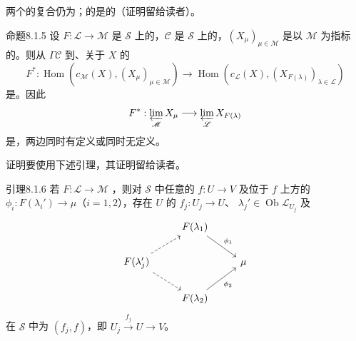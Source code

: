两个的复合仍为；的是的（证明留给读者）。
\begin{SGAresult}{命题}{8.1.5}
设 $F:\mathscr L\to\mathscr M$ 是 $\mathscr S$ 上的，$\mathscr C$ 是 $\mathscr S$ 上的，$(X_\mu)_{\mu\in\mathscr M}$ 是以 $\mathscr M$ 为指标的。则从 $\Gamma\mathscr C$ 到、关于 $X$ 的
\[F^*:\operatorname{Hom}(c_{\mathscr M}(X),(X_\mu)_{\mu\in\mathscr M})\longrightarrow\operatorname{Hom}(c_{\mathscr L}(X),(X_{F(\lambda)})_{\lambda\in\mathscr L})\]
是。因此
\[F^*:\varprojlim_{\mathscr M}X_\mu\longrightarrow\varprojlim_{\mathscr L}X_{F(\lambda)}\]
是，两边同时有定义或同时无定义。
\end{SGAresult}
证明要使用下述引理，其证明留给读者。
\begin{SGAresult}{引理}{8.1.6}
若 $F:\mathscr L\to\mathscr M$ ，则对 $\mathscr S$ 中任意的 $f:U\to V$ 及位于 $f$ 上方的 $\phi_i:F(\lambda_i')\to\mu$（$i=1,2$），存在 $U$ 的
$f_j:U_j\to U$、 $\lambda_j'\in\operatorname{Ob}\mathscr L_{U_j}$ 及
\[\begin{tikzcd} &F(\lambda_1)\arrow[dr,"\phi_1"]&\\
F(\lambda_j')\arrow[ur,dashed]\arrow[dr,dashed]&&\mu\\
&F(\lambda_2)\arrow[ur,"\phi_2"']&
\end{tikzcd}\]
在 $\mathscr S$ 中为 $(f_j,f)$，即 $U_j\xrightarrow{f_j}U\to V$。
\end{SGAresult}
